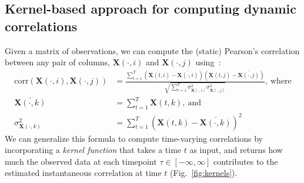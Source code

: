 \documentclass[english]{article}
\begin{document}
\subsection*{Kernel-based approach for computing dynamic correlations}
Given a matrix of observations, we can compute the (static)
Pearson's correlation between any pair of columns, $\mathbf{X}(\cdot, i)$ and
$\mathbf{X}(\cdot, j)$ using~\citep{Pear01}:
\begin{align}
  \mathrm{corr}(\mathbf{X}(\cdot, i), \mathbf{X}(\cdot, j)) &=
                                                              \frac{\sum_{t=1}^T
                                                              \left(\mathbf{X}(t,
                                                              i)
                                                              -
                                                              \bar{\mathbf{X}(\cdot,
                                                              i)}\right)
                                                              \left(\mathbf{X}(t,
                                                              j)
                                                              -
                                                              \bar{\mathbf{X}(\cdot, j)}\right)}{\sqrt{\sum_{t=1}^T
                                                              \sigma^2_{\mathbf{X}(\cdot, i)} 
                                                              \sigma^2_{\mathbf{X}(\cdot, j)}}},~\mathrm{where}\\\label{eqn:corr}
  \bar{\mathbf{X}(\cdot, k)} &= \sum_{t=1}^T
                       \mathbf{X}(t, k),~\mathrm{and}\\
  \sigma^2_{\mathbf{X}(\cdot, k)} &= \sum_{t=1}^T \left( \mathbf{X}(t, k) -
                            \bar{\mathbf{X}(\cdot, k)} \right)^2 
\end{align}
We can generalize this formula to compute time-varying correlations by
incorporating a \textit{kernel function} that takes a time $t$ as
input, and returns how much the observed data at each timepoint
$\tau \in \left[ -\infty, \infty \right]$ contributes to the estimated instantaneous
correlation at time $t$ (Fig.~\ref{fig:kernels}).
\end{document}
